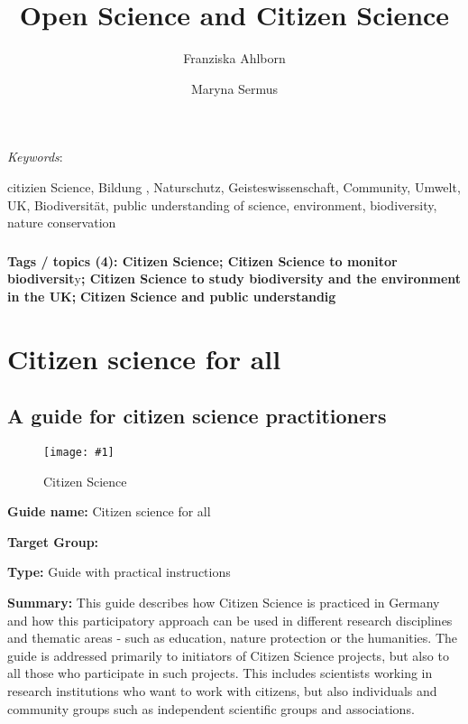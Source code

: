 \documentclass{article}
\def\keywords{\vspace{.5em}
                
{\textit{Keywords}:\,\relax%
                
}}
\newcommand{\sep}{, }
\newlength{\imgwidth}
\newcommand\scaledgraphics[2]{%
                
\settowidth{\imgwidth}{\texttt{[image: \#1]}}%
                
\setlength{\imgwidth}{\minof{\imgwidth}{#2\textwidth}}%
                
\texttt{[image: \#1]}%
                
}
\begin{document}
\title{Open Science and Citizen Science}

\maketitle

\author{Franziska Ahlborn}
\author{Maryna Sermus}
\affil{}


\keywords{citizien Science\sep Bildung \sep Naturschutz\sep Geisteswissenschaft\sep Community\sep Umwelt\sep UK\sep Biodiversität\sep public understanding of science\sep environment\sep biodiversity\sep nature conservation}

\subsubsection{}\label{H1731420}



\textbf{Tags / topics (4): Citizen Science; Citizen Science to monitor biodiversit}y\textbf{; Citizen Science to study biodiversity and the environment in the UK;} \textbf{Citizen Science and public understandig}


\section{Citizen science for all}\label{H2662301}



\subsection{A guide for citizen science practitioners}\label{H9328356}



\begin{center}
\begin{figure}
\scaledgraphics{3cbbd8ed-7495-46a8-8cb5-114cf95cfb83.png}{0.5}
\caption*{Citizen Science}\label{F38618731}
\end{figure}


\end{center}





\textbf{Guide name:} Citizen science for all \autocite{noauthor_citizen_2016}


\textbf{Target Group:}


\textbf{Type: }Guide with practical instructions


\textbf{Summary: }This guide describes how Citizen Science is practiced in Germany and how this participatory approach can be used in different research disciplines and thematic areas - such as education, nature protection or the humanities. The guide is addressed primarily to initiators of Citizen Science projects, but also to all those who participate in such projects. This includes scientists working in research institutions who want to work with citizens, but also individuals and community groups such as independent scientific groups and associations.
\end{document}
